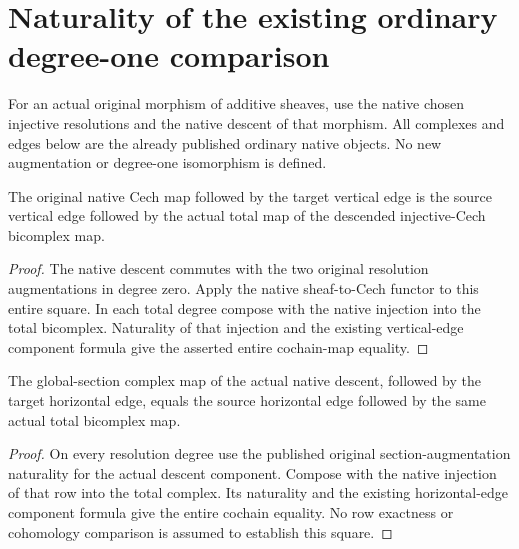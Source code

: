 \section{Naturality of the existing ordinary degree-one comparison}

For an actual original morphism of additive sheaves, use the native
chosen injective resolutions and the native descent of that morphism.
All complexes and edges below are the already published ordinary
native objects. No new augmentation or degree-one isomorphism is
defined.

\begin{lemma}
\label{lem:scheme-module-cech-one-vertical-natural}
\leanok
The original native Cech map followed by the target vertical edge is
the source vertical edge followed by the actual total map of the
descended injective-Cech bicomplex map.
\end{lemma}
\begin{proof}
The native descent commutes with the two original resolution
augmentations in degree zero. Apply the native sheaf-to-Cech functor
to this entire square. In each total degree compose with the native
injection into the total bicomplex. Naturality of that injection and
the existing vertical-edge component formula give the asserted entire
cochain-map equality.
\end{proof}

\begin{lemma}
\label{lem:scheme-module-cech-one-horizontal-natural}
\leanok
The global-section complex map of the actual native descent,
followed by the target horizontal edge, equals the source horizontal
edge followed by the same actual total bicomplex map.
\end{lemma}
\begin{proof}
On every resolution degree use the published original
section-augmentation naturality for the actual descent component.
Compose with the native injection of that row into the total complex.
Its naturality and the existing horizontal-edge component formula give
the entire cochain equality. No row exactness or cohomology comparison
is assumed to establish this square.
\end{proof}

